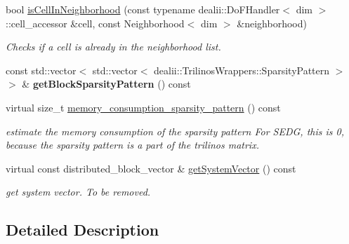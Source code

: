 \begin{DoxyCompactItemize}
\item 
bool \hyperlink{classnatrium_1_1SemiLagrangian_a7facbe9874541441921973030ec6f831}{isCellInNeighborhood} (const typename dealii::DoFHandler$<$ dim $>$::cell\_\-accessor \&cell, const Neighborhood$<$ dim $>$ \&neighborhood)
\begin{DoxyCompactList}\small\item\em Checks if a cell is already in the neighborhood list. \item\end{DoxyCompactList}\item 
\hypertarget{classnatrium_1_1SemiLagrangian_a6cdea22c2d1999275488710ab08c94fa}{
const std::vector$<$ std::vector$<$ dealii::TrilinosWrappers::SparsityPattern $>$ $>$ \& {\bfseries getBlockSparsityPattern} () const }
\label{classnatrium_1_1SemiLagrangian_a6cdea22c2d1999275488710ab08c94fa}

\item 
\hypertarget{classnatrium_1_1SemiLagrangian_ac447ccd4c5b945da503cd57f8072db81}{
virtual size\_\-t \hyperlink{classnatrium_1_1SemiLagrangian_ac447ccd4c5b945da503cd57f8072db81}{memory\_\-consumption\_\-sparsity\_\-pattern} () const }
\label{classnatrium_1_1SemiLagrangian_ac447ccd4c5b945da503cd57f8072db81}

\begin{DoxyCompactList}\small\item\em estimate the memory consumption of the sparsity pattern For SEDG, this is 0, because the sparsity pattern is a part of the trilinos matrix. \item\end{DoxyCompactList}\item 
\hypertarget{classnatrium_1_1SemiLagrangian_a730b721bc86a64418b2ae60fa888b3d4}{
virtual const distributed\_\-block\_\-vector \& \hyperlink{classnatrium_1_1SemiLagrangian_a730b721bc86a64418b2ae60fa888b3d4}{getSystemVector} () const }
\label{classnatrium_1_1SemiLagrangian_a730b721bc86a64418b2ae60fa888b3d4}

\begin{DoxyCompactList}\small\item\em get system vector. To be removed. \item\end{DoxyCompactList}\end{DoxyCompactItemize}


\subsection{Detailed Description}
